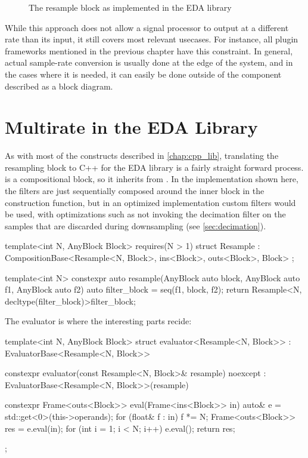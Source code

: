 \begin{figure}
  \centering
  
  \caption{The resample block as implemented in the EDA library}
  \label{fig:block_resample}
\end{figure}

While this approach does not allow a signal processor to output at a different rate than its input, it still
covers most relevant usecases. For instance, all plugin frameworks mentioned in the previous chapter have
this constraint. In general, actual sample-rate conversion is usually done at the edge of the system, and in
the cases where it is needed, it can easily be done outside of the component described as a block diagram.

\section{Multirate in the EDA Library}
\label{sec:multirate_eda}

As with most of the constructs described in \autoref{chap:cpp_lib}, translating the resampling block to C++
for the EDA library is a fairly straight forward process. \Resample is a compositional block, so it inherits
from . In the implementation shown here, the filters are just sequentially composed
around the inner block in the construction function, but in an optimized implementation custom filters would
be used, with optimizations such as not invoking the decimation filter on the samples that are discarded
during downsampling (see \autoref{sec:decimation}).

\begin{cppcodenl}
  template<int N, AnyBlock Block>
  requires(N > 1)
  struct Resample : CompositionBase<Resample<N, Block>, ins<Block>, outs<Block>, Block> {};

  template<int N>
  constexpr auto resample(AnyBlock auto block, AnyBlock auto f1, AnyBlock auto f2)
  {
    auto filter_block = seq(f1, block, f2);
    return Resample<N, decltype(filter_block)>{{filter_block}};
  }
\end{cppcodenl}

The evaluator is where the interesting parts recide:

\begin{cppcode}
  template<int N, AnyBlock Block>
  struct evaluator<Resample<N, Block>> : EvaluatorBase<Resample<N, Block>> {
    constexpr evaluator(const Resample<N, Block>& resample) noexcept
    : EvaluatorBase<Resample<N, Block>>(resample)
    {}

    constexpr Frame<outs<Block>> eval(Frame<ins<Block>> in)
    {
      auto& e = std::get<0>(this->operands);
      for (float& f : in) {
        f *= N;
      }
      Frame<outs<Block>> res = e.eval(in);
      for (int i = 1; i < N; i++) {
        e.eval({});
      }
      return res; 
    }
  };
\end{cppcode}

